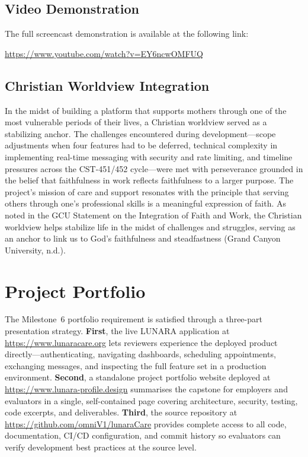 \documentclass[12pt,letterpaper]{article}
\begin{document}
\subsection{Video Demonstration}

The full screencast demonstration is available at the following link:

\begin{center}
\url{https://www.youtube.com/watch?v=EY6ncwOMFUQ}
\end{center}

\subsection{Christian Worldview Integration}

In the midst of building a platform that supports mothers through one of the most vulnerable periods of their lives, a Christian worldview served as a stabilizing anchor. The challenges encountered during development---scope adjustments when four features had to be deferred, technical complexity in implementing real-time messaging with security and rate limiting, and timeline pressures across the CST-451/452 cycle---were met with perseverance grounded in the belief that faithfulness in work reflects faithfulness to a larger purpose. The project's mission of care and support resonates with the principle that serving others through one's professional skills is a meaningful expression of faith. As noted in the GCU Statement on the Integration of Faith and Work, the Christian worldview helps stabilize life in the midst of challenges and struggles, serving as an anchor to link us to God's faithfulness and steadfastness (Grand Canyon University, n.d.).

\newpage

\section{Project Portfolio}

The Milestone~6 portfolio requirement is satisfied through a three-part presentation strategy. \textbf{First}, the live LUNARA application at \url{https://www.lunaracare.org} lets reviewers experience the deployed product directly---authenticating, navigating dashboards, scheduling appointments, exchanging messages, and inspecting the full feature set in a production environment. \textbf{Second}, a standalone project portfolio website deployed at \url{https://www.lunara-profile.design} summarises the capstone for employers and evaluators in a single, self-contained page covering architecture, security, testing, code excerpts, and deliverables. \textbf{Third}, the source repository at \url{https://github.com/omniV1/lunaraCare} provides complete access to all code, documentation, CI/CD configuration, and commit history so evaluators can verify development best practices at the source level.
\end{document}
